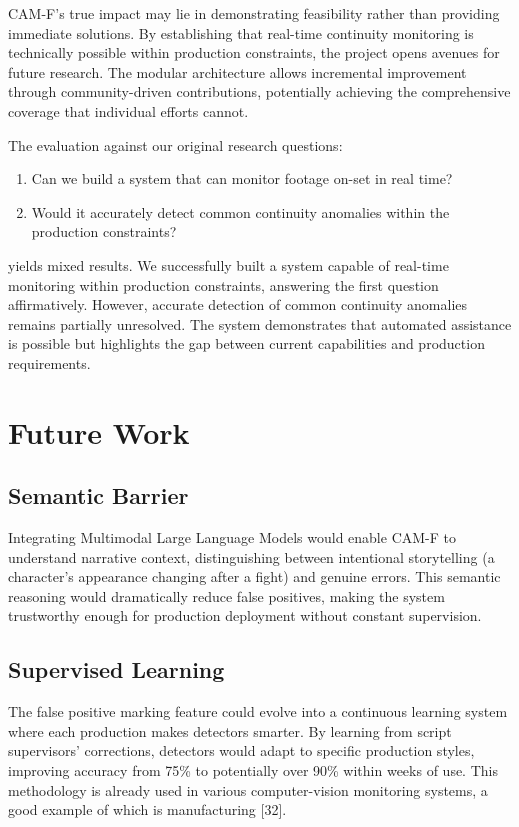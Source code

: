 CAM-F's true impact may lie in demonstrating feasibility rather than providing immediate solutions. By establishing that real-time continuity monitoring is technically possible within production constraints, the project opens avenues for future research. The modular architecture allows incremental improvement through community-driven contributions, potentially achieving the comprehensive coverage that individual efforts cannot.

The evaluation against our original research questions:
\begin{enumerate}
\item Can we build a system that can monitor footage on-set in real time?
\item Would it accurately detect common continuity anomalies within the production constraints?
\end{enumerate}
yields mixed results. We successfully built a system capable of real-time monitoring within production constraints, answering the first question affirmatively. However, accurate detection of common continuity anomalies remains partially unresolved. The system demonstrates that automated assistance is possible but highlights the gap between current capabilities and production requirements.

\section{Future Work}

\subsection{Semantic Barrier}
Integrating Multimodal Large Language Models would enable CAM-F to understand narrative context, distinguishing between intentional storytelling (a character's appearance changing after a fight) and genuine errors. This semantic reasoning would dramatically reduce false positives, making the system trustworthy enough for production deployment without constant supervision. 

\subsection{Supervised Learning}
The false positive marking feature could evolve into a continuous learning system where each production makes detectors smarter. By learning from script supervisors' corrections, detectors would adapt to specific production styles, improving accuracy from 75\% to potentially over 90\% within weeks of use. This methodology is already used in various computer-vision monitoring systems, a good example of which is manufacturing [32].

